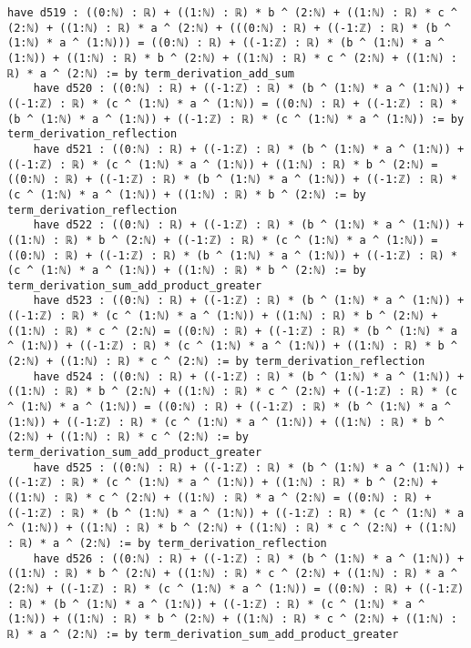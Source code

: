 \documentclass{article}
\begin{document}
\begin{tcolorbox}[colback=white!10, width=\linewidth]
\begin{lstlisting}[language=Lean4]
    have d519 : ((0:ℕ) : ℝ) + ((1:ℕ) : ℝ) * b ^ (2:ℕ) + ((1:ℕ) : ℝ) * c ^ (2:ℕ) + ((1:ℕ) : ℝ) * a ^ (2:ℕ) + (((0:ℕ) : ℝ) + ((-1:ℤ) : ℝ) * (b ^ (1:ℕ) * a ^ (1:ℕ))) = ((0:ℕ) : ℝ) + ((-1:ℤ) : ℝ) * (b ^ (1:ℕ) * a ^ (1:ℕ)) + ((1:ℕ) : ℝ) * b ^ (2:ℕ) + ((1:ℕ) : ℝ) * c ^ (2:ℕ) + ((1:ℕ) : ℝ) * a ^ (2:ℕ) := by term_derivation_add_sum
    have d520 : ((0:ℕ) : ℝ) + ((-1:ℤ) : ℝ) * (b ^ (1:ℕ) * a ^ (1:ℕ)) + ((-1:ℤ) : ℝ) * (c ^ (1:ℕ) * a ^ (1:ℕ)) = ((0:ℕ) : ℝ) + ((-1:ℤ) : ℝ) * (b ^ (1:ℕ) * a ^ (1:ℕ)) + ((-1:ℤ) : ℝ) * (c ^ (1:ℕ) * a ^ (1:ℕ)) := by term_derivation_reflection
    have d521 : ((0:ℕ) : ℝ) + ((-1:ℤ) : ℝ) * (b ^ (1:ℕ) * a ^ (1:ℕ)) + ((-1:ℤ) : ℝ) * (c ^ (1:ℕ) * a ^ (1:ℕ)) + ((1:ℕ) : ℝ) * b ^ (2:ℕ) = ((0:ℕ) : ℝ) + ((-1:ℤ) : ℝ) * (b ^ (1:ℕ) * a ^ (1:ℕ)) + ((-1:ℤ) : ℝ) * (c ^ (1:ℕ) * a ^ (1:ℕ)) + ((1:ℕ) : ℝ) * b ^ (2:ℕ) := by term_derivation_reflection
    have d522 : ((0:ℕ) : ℝ) + ((-1:ℤ) : ℝ) * (b ^ (1:ℕ) * a ^ (1:ℕ)) + ((1:ℕ) : ℝ) * b ^ (2:ℕ) + ((-1:ℤ) : ℝ) * (c ^ (1:ℕ) * a ^ (1:ℕ)) = ((0:ℕ) : ℝ) + ((-1:ℤ) : ℝ) * (b ^ (1:ℕ) * a ^ (1:ℕ)) + ((-1:ℤ) : ℝ) * (c ^ (1:ℕ) * a ^ (1:ℕ)) + ((1:ℕ) : ℝ) * b ^ (2:ℕ) := by term_derivation_sum_add_product_greater
    have d523 : ((0:ℕ) : ℝ) + ((-1:ℤ) : ℝ) * (b ^ (1:ℕ) * a ^ (1:ℕ)) + ((-1:ℤ) : ℝ) * (c ^ (1:ℕ) * a ^ (1:ℕ)) + ((1:ℕ) : ℝ) * b ^ (2:ℕ) + ((1:ℕ) : ℝ) * c ^ (2:ℕ) = ((0:ℕ) : ℝ) + ((-1:ℤ) : ℝ) * (b ^ (1:ℕ) * a ^ (1:ℕ)) + ((-1:ℤ) : ℝ) * (c ^ (1:ℕ) * a ^ (1:ℕ)) + ((1:ℕ) : ℝ) * b ^ (2:ℕ) + ((1:ℕ) : ℝ) * c ^ (2:ℕ) := by term_derivation_reflection
    have d524 : ((0:ℕ) : ℝ) + ((-1:ℤ) : ℝ) * (b ^ (1:ℕ) * a ^ (1:ℕ)) + ((1:ℕ) : ℝ) * b ^ (2:ℕ) + ((1:ℕ) : ℝ) * c ^ (2:ℕ) + ((-1:ℤ) : ℝ) * (c ^ (1:ℕ) * a ^ (1:ℕ)) = ((0:ℕ) : ℝ) + ((-1:ℤ) : ℝ) * (b ^ (1:ℕ) * a ^ (1:ℕ)) + ((-1:ℤ) : ℝ) * (c ^ (1:ℕ) * a ^ (1:ℕ)) + ((1:ℕ) : ℝ) * b ^ (2:ℕ) + ((1:ℕ) : ℝ) * c ^ (2:ℕ) := by term_derivation_sum_add_product_greater
    have d525 : ((0:ℕ) : ℝ) + ((-1:ℤ) : ℝ) * (b ^ (1:ℕ) * a ^ (1:ℕ)) + ((-1:ℤ) : ℝ) * (c ^ (1:ℕ) * a ^ (1:ℕ)) + ((1:ℕ) : ℝ) * b ^ (2:ℕ) + ((1:ℕ) : ℝ) * c ^ (2:ℕ) + ((1:ℕ) : ℝ) * a ^ (2:ℕ) = ((0:ℕ) : ℝ) + ((-1:ℤ) : ℝ) * (b ^ (1:ℕ) * a ^ (1:ℕ)) + ((-1:ℤ) : ℝ) * (c ^ (1:ℕ) * a ^ (1:ℕ)) + ((1:ℕ) : ℝ) * b ^ (2:ℕ) + ((1:ℕ) : ℝ) * c ^ (2:ℕ) + ((1:ℕ) : ℝ) * a ^ (2:ℕ) := by term_derivation_reflection
    have d526 : ((0:ℕ) : ℝ) + ((-1:ℤ) : ℝ) * (b ^ (1:ℕ) * a ^ (1:ℕ)) + ((1:ℕ) : ℝ) * b ^ (2:ℕ) + ((1:ℕ) : ℝ) * c ^ (2:ℕ) + ((1:ℕ) : ℝ) * a ^ (2:ℕ) + ((-1:ℤ) : ℝ) * (c ^ (1:ℕ) * a ^ (1:ℕ)) = ((0:ℕ) : ℝ) + ((-1:ℤ) : ℝ) * (b ^ (1:ℕ) * a ^ (1:ℕ)) + ((-1:ℤ) : ℝ) * (c ^ (1:ℕ) * a ^ (1:ℕ)) + ((1:ℕ) : ℝ) * b ^ (2:ℕ) + ((1:ℕ) : ℝ) * c ^ (2:ℕ) + ((1:ℕ) : ℝ) * a ^ (2:ℕ) := by term_derivation_sum_add_product_greater

\end{lstlisting}
\end{tcolorbox}
\end{document}
